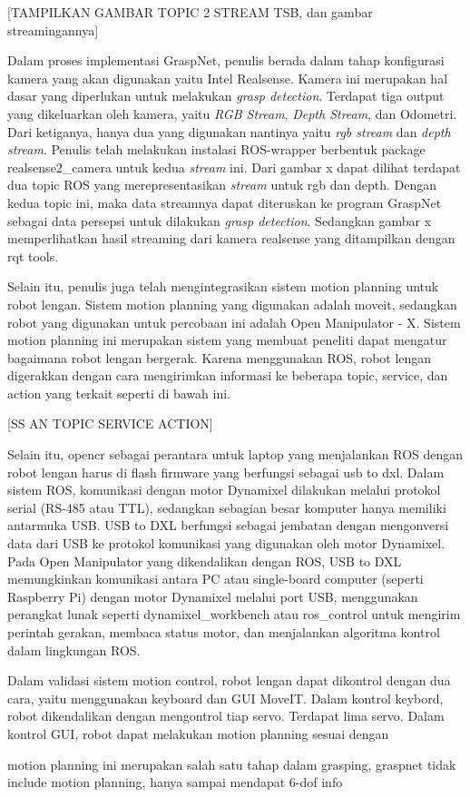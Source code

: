 [TAMPILKAN GAMBAR TOPIC 2 STREAM TSB, dan gambar streamingannya]

Dalam proses implementasi GraspNet, penulis berada dalam tahap konfigurasi kamera yang akan digunakan yaitu Intel Realsense.
Kamera ini merupakan hal dasar yang diperlukan untuk melakukan \emph{grasp detection}. Terdapat tiga output yang dikeluarkan oleh kamera,
yaitu \emph{RGB Stream}, \emph{Depth Stream}, dan Odometri. Dari ketiganya, hanya dua yang digunakan nantinya yaitu \emph{rgb stream}
dan \emph{depth stream}. Penulis telah melakukan instalasi ROS-wrapper berbentuk package realsense2_camera untuk kedua \emph{stream} ini.
Dari gambar x dapat dilihat terdapat dua topic ROS yang merepresentasikan \emph{stream} untuk rgb dan depth. Dengan kedua topic ini,
maka data streamnya dapat diteruskan ke program GraspNet sebagai data persepsi untuk dilakukan \emph{grasp detection}. Sedangkan gambar x
memperlihatkan hasil streaming dari kamera realsense yang ditampilkan dengan rqt tools.

Selain itu, penulis juga telah mengintegrasikan sistem motion planning untuk robot lengan. Sistem motion planning yang digunakan adalah moveit,
sedangkan robot yang digunakan untuk percobaan ini adalah Open Manipulator - X. Sistem motion planning ini merupakan sistem yang membuat
peneliti dapat mengatur bagaimana robot lengan bergerak. Karena menggunakan ROS, robot lengan digerakkan dengan cara mengirimkan informasi
ke beberapa topic, service, dan action yang terkait seperti di bawah ini.

[SS AN TOPIC SERVICE ACTION]

Selain itu, opencr sebagai perantara untuk laptop yang menjalankan ROS dengan robot lengan harus di flash firmware yang berfungsi sebagai
usb to dxl. Dalam sistem ROS, komunikasi dengan motor Dynamixel dilakukan melalui protokol serial (RS-485 atau TTL),
sedangkan sebagian besar komputer hanya memiliki antarmuka USB. USB to DXL berfungsi sebagai jembatan dengan mengonversi data dari
USB ke protokol komunikasi yang digunakan oleh motor Dynamixel. Pada Open Manipulator yang dikendalikan dengan ROS,
USB to DXL memungkinkan komunikasi antara PC atau single-board computer (seperti Raspberry Pi) dengan motor Dynamixel
melalui port USB, menggunakan perangkat lunak seperti dynamixel_workbench atau ros_control untuk mengirim perintah gerakan,
membaca status motor, dan menjalankan algoritma kontrol dalam lingkungan ROS.

Dalam validasi sistem motion control, robot lengan dapat dikontrol dengan dua cara, yaitu menggunakan keyboard dan GUI MoveIT.
Dalam kontrol keybord, robot dikendalikan dengan mengontrol tiap servo. Terdapat lima servo.
Dalam kontrol GUI, robot dapat melakukan motion planning sesuai dengan 

motion planning ini merupakan salah satu tahap dalam grasping,
graspnet tidak include motion planning, hanya sampai mendapat 6-dof info